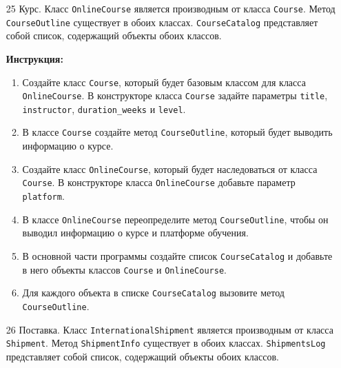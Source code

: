 \begin{enumerate}
\item[25]
Курс. Класс \texttt{OnlineCourse} является производным от класса \texttt{Course}. Метод \texttt{CourseOutline} существует в обоих классах. \texttt{CourseCatalog} представляет собой список, содержащий объекты обоих классов.

\textbf{Инструкция:}
\begin{enumerate}
    \item Создайте класс \texttt{Course}, который будет базовым классом для класса \texttt{OnlineCourse}. В конструкторе класса \texttt{Course} задайте параметры \texttt{title}, \texttt{instructor}, \texttt{duration\_weeks} и \texttt{level}.
    \item В классе \texttt{Course} создайте метод \texttt{CourseOutline}, который будет выводить информацию о курсе.
    \item Создайте класс \texttt{OnlineCourse}, который будет наследоваться от класса \texttt{Course}. В конструкторе класса \texttt{OnlineCourse} добавьте параметр \texttt{platform}.
    \item В классе \texttt{OnlineCourse} переопределите метод \texttt{CourseOutline}, чтобы он выводил информацию о курсе и платформе обучения.
    \item В основной части программы создайте список \texttt{CourseCatalog} и добавьте в него объекты классов \texttt{Course} и \texttt{OnlineCourse}.
    \item Для каждого объекта в списке \texttt{CourseCatalog} вызовите метод \texttt{CourseOutline}.
\end{enumerate}

\item[26]
Поставка. Класс \texttt{InternationalShipment} является производным от класса \texttt{Shipment}. Метод \texttt{ShipmentInfo} существует в обоих классах. \texttt{ShipmentsLog} представляет собой список, содержащий объекты обоих классов.


\end{enumerate}
